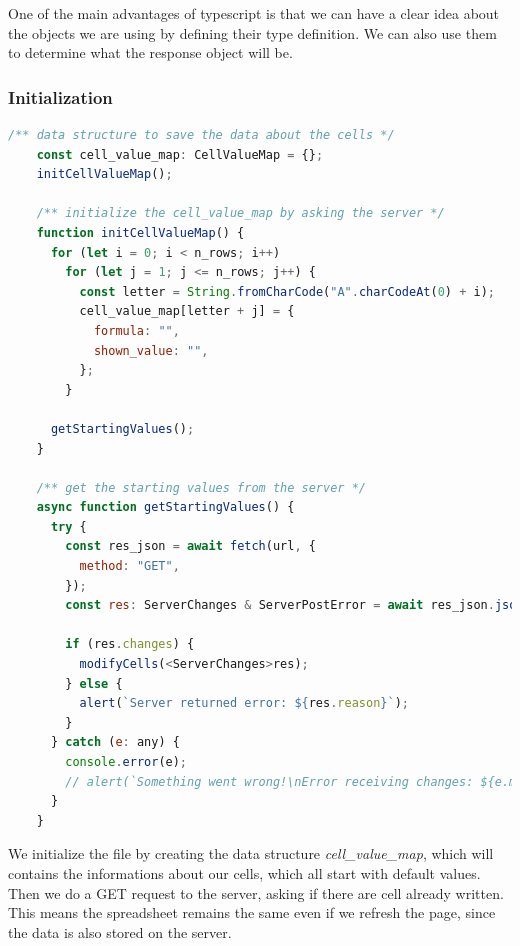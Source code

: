 \documentclass[12pt, a4paper]{article}
\begin{document}
  One of the main advantages of typescript is that we can have a clear idea about the objects we are using by defining their type definition. We can also use them to determine what the response object will be.

  \pagebreak

  \subsubsection{Initialization}
  \begin{lstlisting}[language=javascript, caption={initialization}]
    /** data structure to save the data about the cells */
    const cell_value_map: CellValueMap = {};
    initCellValueMap();

    /** initialize the cell_value_map by asking the server */
    function initCellValueMap() {
      for (let i = 0; i < n_rows; i++)
        for (let j = 1; j <= n_rows; j++) {
          const letter = String.fromCharCode("A".charCodeAt(0) + i);
          cell_value_map[letter + j] = {
            formula: "",
            shown_value: "",
          };
        }

      getStartingValues();
    }

    /** get the starting values from the server */
    async function getStartingValues() {
      try {
        const res_json = await fetch(url, {
          method: "GET",
        });
        const res: ServerChanges & ServerPostError = await res_json.json();

        if (res.changes) {
          modifyCells(<ServerChanges>res);
        } else {
          alert(`Server returned error: ${res.reason}`);
        }
      } catch (e: any) {
        console.error(e);
        // alert(`Something went wrong!\nError receiving changes: ${e.message}`);
      }
    }
  \end{lstlisting}

  We initialize the file by creating the data structure \textit{cell\_value\_map}, which will contains the informations about our cells, which all start with default values. Then we do a GET request to the server, asking if there are cell already written. This means the spreadsheet remains the same even if we refresh the page, since the data is also stored on the server.
\end{document}
